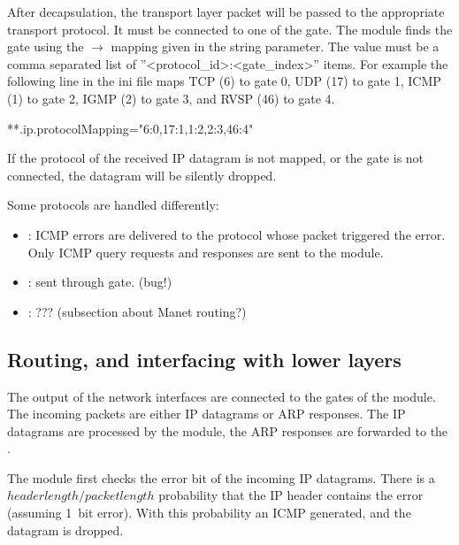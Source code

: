 After decapsulation, the transport layer packet will be passed to the appropriate
transport protocol. It must be connected to one of the  gate.
The  module finds the gate using the $\rightarrow$
 mapping given in the  string parameter.
The value must be a comma separated list of ''<protocol\_id>:<gate\_index>'' items.
For example the following line in the ini file maps TCP (6) to gate 0, UDP (17)
to gate 1, ICMP (1) to gate 2, IGMP (2) to gate 3, and RVSP (46) to gate 4.
\begin{inifile}
**.ip.protocolMapping="6:0,17:1,1:2,2:3,46:4"
\end{inifile}
If the protocol of the received IP datagram is not mapped, or the gate
is not connected, the datagram will be silently dropped.

Some protocols are handled differently:
\begin{itemize}
  \item {}: ICMP errors are delivered to the protocol
        whose packet triggered the error. Only ICMP query
        requests and responses are sent to the  module.
  \item {}: sent through  gate. (bug!)
  \item {}: ??? (subsection about Manet routing?)
\end{itemize}



\subsection{Routing, and interfacing with lower layers}
\label{subsec:ip_routing}

The output of the network interfaces are connected to the
 gates of the  module. The incoming
packets are either IP datagrams or ARP responses. The IP datagrams
are processed by the  module, the ARP
responses are forwarded to the .

The  module first checks the error bit of the
incoming IP datagrams. There is a $header length/packet length$
probability that the IP header contains the error (assuming
1~bit error). With this probability an ICMP 
generated, and the datagram is dropped.

